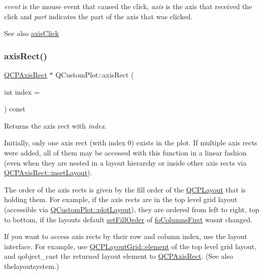 {\itshape event} is the mouse event that caused the click, {\itshape axis} is the axis that received the click and {\itshape part} indicates the part of the axis that was clicked.

\begin{DoxySeeAlso}{See also}
\hyperlink{classQCustomPlot_abf635f8b56ab5c16d5de9f358543e82b}{axis\+Click} 
\end{DoxySeeAlso}
\mbox{\label{classQCustomPlot_ae5eefcb5f6ca26689b1fd4f6e25b42f9}} 
\subsubsection{\texorpdfstring{axis\+Rect()}{axisRect()}}
{\footnotesize\ttfamily \hyperlink{classQCPAxisRect}{Q\+C\+P\+Axis\+Rect} $\ast$ Q\+Custom\+Plot\+::axis\+Rect (\begin{DoxyParamCaption}\item[{int}]{index = {} }\end{DoxyParamCaption}) const}

Returns the axis rect with {\itshape index}.

Initially, only one axis rect (with index 0) exists in the plot. If multiple axis rects were added, all of them may be accessed with this function in a linear fashion (even when they are nested in a layout hierarchy or inside other axis rects via \hyperlink{classQCPAxisRect_a949f803466619924c7018df4b511ae10}{Q\+C\+P\+Axis\+Rect\+::inset\+Layout}).

The order of the axis rects is given by the fill order of the \hyperlink{classQCPLayout}{Q\+C\+P\+Layout} that is holding them. For example, if the axis rects are in the top level grid layout (accessible via \hyperlink{classQCustomPlot_af1a1f1f571237deb7c2bd34a5e9f018f}{Q\+Custom\+Plot\+::plot\+Layout}), they are ordered from left to right, top to bottom, if the layout\textquotesingle{}s default \hyperlink{classQCPLayoutGrid_affc2f3cfd22f28698c5b29b960d2a391}{set\+Fill\+Order} of \hyperlink{classQCPLayoutGrid_a7d49ee08773de6b2fd246edfed353ccaac4cb4b796ec4822d5894b47b51627fb3}{fo\+Columns\+First} wasn\textquotesingle{}t changed.

If you want to access axis rects by their row and column index, use the layout interface. For example, use \hyperlink{classQCPLayoutGrid_a602b426609b4411cf6a93c3ddf3a381a}{Q\+C\+P\+Layout\+Grid\+::element} of the top level grid layout, and {\ttfamily qobject\+\_\+cast} the returned layout element to \hyperlink{classQCPAxisRect}{Q\+C\+P\+Axis\+Rect}. (See also thelayoutsystem.)

